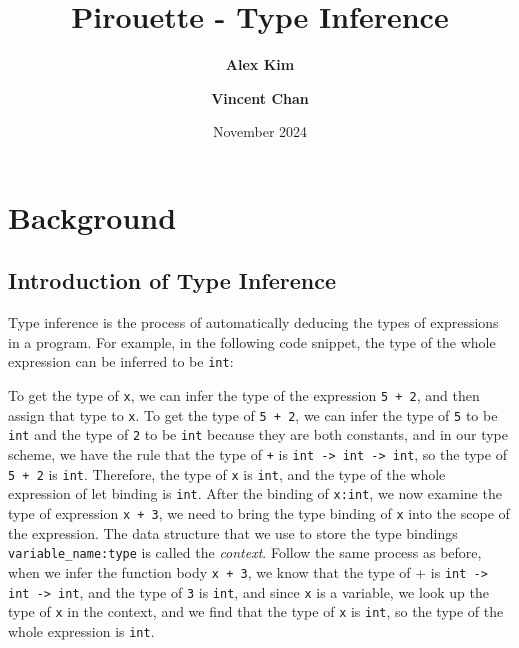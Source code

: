 \documentclass{article}
\title{Pirouette - Type Inference}
\author{\textbf{Alex Kim} \and \textbf{Vincent Chan}}
\date{November 2024}
\begin{document}
\maketitle

\listoffixmes{} %

\section{Background}

\subsection{Introduction of Type Inference}
    Type inference is the process of automatically deducing the types of expressions in a program.
    For example, in the following code snippet, the type of the whole expression can be inferred to be \texttt{int}:

    \begin{center}
        \setlength{\fboxsep}{5pt}
    \end{center}

    To get the type of \texttt{x}, we can infer the type of the expression \texttt{5 + 2}, and then assign that type to \texttt{x}.
    To get the type of \texttt{5 + 2}, we can infer the type of \texttt{5} to be \texttt{int} and the type of \texttt{2} to be \texttt{int}
    because they are both constants, and in our type scheme, we have the rule that the type of \texttt{+} is \texttt{int -> int -> int}, so the type of \texttt{5 + 2} is \texttt{int}.
    Therefore, the type of \texttt{x} is \texttt{int}, and the type of the whole expression of let binding is \texttt{int}. After the binding of \texttt{x:int}, we now examine the type of expression \texttt{x + 3},
    we need to bring the type binding of \texttt{x} into the scope of the expression. The data structure that we use to store the type bindings \texttt{variable\_name:type} is called the \textit{context}.
    Follow the same process as before, when we infer the function body \texttt{x + 3}, we know that the type of {+} is \texttt{int -> int -> int}, and the type of \texttt{3} is \texttt{int},
    and since \texttt{x} is a variable, we look up the type of \texttt{x} in the context, and we find that the type of \texttt{x} is \texttt{int}, so the type of the whole expression is \texttt{int}.
\end{document}
